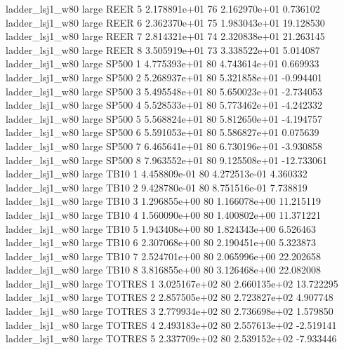     ladder_lsj1_w80      large     REER                 5 2.178891e+01 76   2.162970e+01           0.736102
    ladder_lsj1_w80      large     REER                 6 2.362370e+01 75   1.983043e+01          19.128530
    ladder_lsj1_w80      large     REER                 7 2.814321e+01 74   2.320838e+01          21.263145
    ladder_lsj1_w80      large     REER                 8 3.505919e+01 73   3.338522e+01           5.014087
    ladder_lsj1_w80      large    SP500                 1 4.775393e+01 80   4.743614e+01           0.669933
    ladder_lsj1_w80      large    SP500                 2 5.268937e+01 80   5.321858e+01          -0.994401
    ladder_lsj1_w80      large    SP500                 3 5.495548e+01 80   5.650023e+01          -2.734053
    ladder_lsj1_w80      large    SP500                 4 5.528533e+01 80   5.773462e+01          -4.242332
    ladder_lsj1_w80      large    SP500                 5 5.568824e+01 80   5.812650e+01          -4.194757
    ladder_lsj1_w80      large    SP500                 6 5.591053e+01 80   5.586827e+01           0.075639
    ladder_lsj1_w80      large    SP500                 7 6.465641e+01 80   6.730196e+01          -3.930858
    ladder_lsj1_w80      large    SP500                 8 7.963552e+01 80   9.125508e+01         -12.733061
    ladder_lsj1_w80      large     TB10                 1 4.458809e-01 80   4.272513e-01           4.360332
    ladder_lsj1_w80      large     TB10                 2 9.428780e-01 80   8.751516e-01           7.738819
    ladder_lsj1_w80      large     TB10                 3 1.296855e+00 80   1.166078e+00          11.215119
    ladder_lsj1_w80      large     TB10                 4 1.560090e+00 80   1.400802e+00          11.371221
    ladder_lsj1_w80      large     TB10                 5 1.943408e+00 80   1.824343e+00           6.526463
    ladder_lsj1_w80      large     TB10                 6 2.307068e+00 80   2.190451e+00           5.323873
    ladder_lsj1_w80      large     TB10                 7 2.524701e+00 80   2.065996e+00          22.202658
    ladder_lsj1_w80      large     TB10                 8 3.816855e+00 80   3.126468e+00          22.082008
    ladder_lsj1_w80      large   TOTRES                 1 3.025167e+02 80   2.660135e+02          13.722295
    ladder_lsj1_w80      large   TOTRES                 2 2.857505e+02 80   2.723827e+02           4.907748
    ladder_lsj1_w80      large   TOTRES                 3 2.779934e+02 80   2.736698e+02           1.579850
    ladder_lsj1_w80      large   TOTRES                 4 2.493183e+02 80   2.557613e+02          -2.519141
    ladder_lsj1_w80      large   TOTRES                 5 2.337709e+02 80   2.539152e+02          -7.933446
